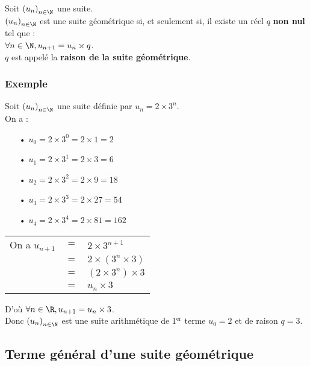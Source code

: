 Soit $\left(u_n\right)_{n \in \N}$ une suite. \\

$\left(u_n\right)_{n \in \N}$ est une suite géométrique si, et seulement si, il existe un réel $q$ \textbf{non nul} tel que : \\
$\forall n \in \N, u_{n+1} = u_n \times q$. \\

$q$ est appelé la \textbf{raison de la suite géométrique}. 

\subsubsection{Exemple}
Soit $\left(u_n\right)_{n \in \N}$ une suite définie par $u_n = 2 \times 3^n$. \\

On a : 

\begin{itemize}
\item[•] $u_0 = 2 \times 3^0 = 2 \times 1 = 2$
\item[•] $u_1 = 2 \times 3^1 = 2 \times 3 = 6$
\item[•] $u_2 = 2 \times 3^2 = 2 \times 9 = 18$
\item[•] $u_3 = 2 \times 3^3 = 2 \times 27 = 54$
\item[•] $u_4 = 2 \times 3^4 = 2 \times 81 = 162$
\end{itemize}

\vspace*{.3cm}

\begin{tabular}{lll}
On a $u_{n+1}$ & $ = $ & $ 2 \times 3^{n+1}$ \\
& $=$ & $2 \times \left(3^n \times 3\right)$ \\
& $=$ & $\left(2 \times 3^n\right) \times 3$ \\
& $=$ & $u_n \times 3$ \\
\end{tabular}

\vspace*{.3cm}

D'où $\forall n \in \R, u_{n+1} = u_n \times 3$. \\

Donc $\left(u_n\right)_{n \in \N}$ est une suite arithmétique de 1$^{\mathrm{er}}$ terme $u_0 = 2$ et de raison $q = 3$. 

\subsection{Terme général d'une suite géométrique}

